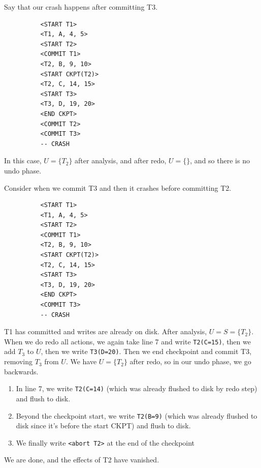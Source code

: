 \documentclass{article}
\begin{document}
      \begin{example}
        Say that our crash happens after committing T3. 

        \begin{lstlisting}
          <START T1>
          <T1, A, 4, 5>
          <START T2>
          <COMMIT T1>
          <T2, B, 9, 10>
          <START CKPT(T2)>
          <T2, C, 14, 15>
          <START T3>
          <T3, D, 19, 20>
          <END CKPT>
          <COMMIT T2>
          <COMMIT T3>
          -- CRASH
        \end{lstlisting} 
        In this case, $U = \{T_2\}$ after analysis, and after redo, $U = \{\}$, and so there is no undo phase. 
      \end{example}

      \begin{example}
        Consider when we commit T3 and then it crashes before committing T2. 
        \begin{lstlisting}
          <START T1>
          <T1, A, 4, 5>
          <START T2>
          <COMMIT T1>
          <T2, B, 9, 10>
          <START CKPT(T2)>
          <T2, C, 14, 15>
          <START T3>
          <T3, D, 19, 20>
          <END CKPT>
          <COMMIT T3>
          -- CRASH
        \end{lstlisting} 
        T1 has committed and writes are already on disk. After analysis, $U = S = \{T_2\}$. When we do redo all actions, we again take line 7 and write \texttt{T2(C=15)}, then we add $T_3$ to $U$, then we write \texttt{T3(D=20)}. Then we end checkpoint and commit T3, removing $T_3$ from $U$. We have $U = \{T_2\}$ after redo, so in our undo phase, we go backwards. 
        \begin{enumerate}
          \item In line 7, we write \texttt{T2(C=14)} (which was already flushed to disk by redo step) and flush to disk.  
          \item Beyond the checkpoint start, we write \texttt{T2(B=9)} (which was already flushed to disk since it's before the start CKPT) and flush to disk. 
          \item We finally write \texttt{<abort T2>} at the end of the checkpoint
        \end{enumerate} 
        We are done, and the effects of T2 have vanished. 
      \end{example}
\end{document}
